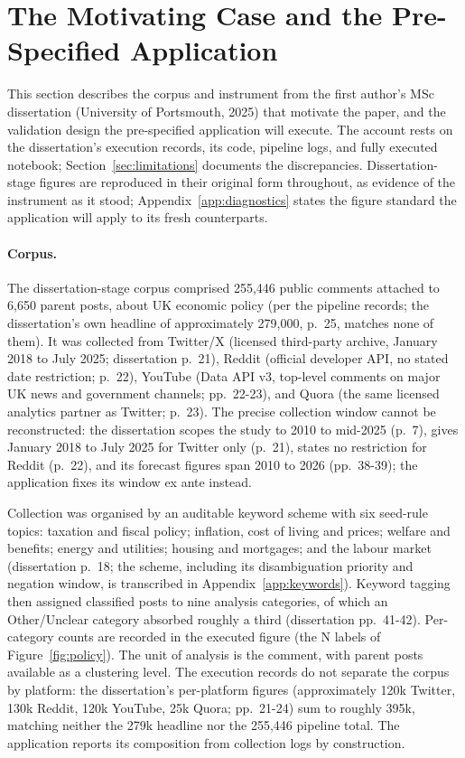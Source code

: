 
\section{The Motivating Case and the Pre-Specified Application}
\label{sec:data}

This section describes the corpus and instrument from the first author's MSc dissertation (University of Portsmouth, 2025) that motivate the paper, and the validation design the pre-specified application will execute. The account rests on the dissertation's execution records, its code, pipeline logs, and fully executed notebook; Section~\ref{sec:limitations} documents the discrepancies. Dissertation-stage figures are reproduced in their original form throughout, as evidence of the instrument as it stood; Appendix~\ref{app:diagnostics} states the figure standard the application will apply to its fresh counterparts.

\paragraph{Corpus.}
The dissertation-stage corpus comprised 255,446 public comments attached to 6,650 parent posts, about UK economic policy (per the pipeline records; the dissertation's own headline of approximately 279,000, p.~25, matches none of them). It was collected from Twitter/X (licensed third-party archive, January 2018 to July 2025; dissertation p.~21), Reddit (official developer API, no stated date restriction; p.~22), YouTube (Data API v3, top-level comments on major UK news and government channels; pp.~22-23), and Quora (the same licensed analytics partner as Twitter; p.~23). The precise collection window cannot be reconstructed: the dissertation scopes the study to 2010 to mid-2025 (p.~7), gives January 2018 to July 2025 for Twitter only (p.~21), states no restriction for Reddit (p.~22), and its forecast figures span 2010 to 2026 (pp.~38-39); the application fixes its window ex ante instead.

Collection was organised by an auditable keyword scheme with six seed-rule topics: taxation and fiscal policy; inflation, cost of living and prices; welfare and benefits; energy and utilities; housing and mortgages; and the labour market (dissertation p.~18; the scheme, including its disambiguation priority and negation window, is transcribed in Appendix~\ref{app:keywords}). Keyword tagging then assigned classified posts to nine analysis categories, of which an Other/Unclear category absorbed roughly a third (dissertation pp.~41-42). Per-category counts are recorded in the executed figure (the N labels of Figure~\ref{fig:policy}). The unit of analysis is the comment, with parent posts available as a clustering level. The execution records do not separate the corpus by platform: the dissertation's per-platform figures (approximately 120k Twitter, 130k Reddit, 120k YouTube, 25k Quora; pp.~21-24) sum to roughly 395k, matching neither the 279k headline nor the 255,446 pipeline total. The application reports its composition from collection logs by construction.

